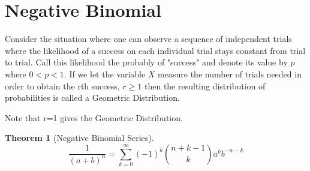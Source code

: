 \documentclass[10pt,]{book}
\theoremstyle{plain}
\newtheorem{theorem}{Theorem}[section]
\theoremstyle{definition}
\theoremstyle{definition}
\theoremstyle{definition}
\numberwithin{equation}{section}
\newcommand{\lt}{ < }
\begin{document}
\section[{Negative Binomial}]{Negative Binomial}\label{section-32}
Consider the situation where one can observe a sequence  of independent
	trials where the likelihood of a success on each individual trial
	stays constant from trial to trial. Call this likelihood the probably of
	"success" and denote its value by \(p\) 
	where \( 0 \lt p \lt 1 \).  
	If we let the variable \(X\) measure the number of trials needed in order
	to obtain the rth success, \(r \ge 1\) 
	then the resulting distribution of probabilities is called a 
	Geometric Distribution.%
\par
Note that r=1 gives the Geometric Distribution.%
\begin{theorem}[{Negative Binomial Series}]\label{theorem-47}
\begin{equation*}\displaystyle \frac{1}{(a+b)^n} = \sum_{k=0}^{\infty} {(-1)^k \binom{n + k - 1}{k} a^k b^{-n-k}}\end{equation*}\end{theorem}
\end{document}
